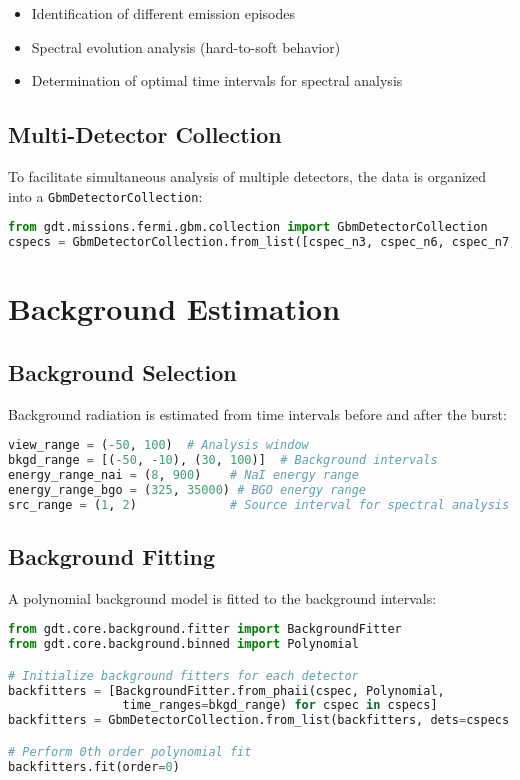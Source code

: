 \documentclass{article}
\begin{document}
\begin{itemize}
    \item Identification of different emission episodes
    \item Spectral evolution analysis (hard-to-soft behavior)
    \item Determination of optimal time intervals for spectral analysis
\end{itemize}

\subsection{Multi-Detector Collection}

To facilitate simultaneous analysis of multiple detectors, the data is organized into a \texttt{GbmDetectorCollection}:

\begin{lstlisting}[language=Python]
from gdt.missions.fermi.gbm.collection import GbmDetectorCollection
cspecs = GbmDetectorCollection.from_list([cspec_n3, cspec_n6, cspec_n7, cspec_b0])
\end{lstlisting}

\section{Background Estimation}

\subsection{Background Selection}

Background radiation is estimated from time intervals before and after the burst:

\begin{lstlisting}[language=Python]
view_range = (-50, 100)  # Analysis window
bkgd_range = [(-50, -10), (30, 100)]  # Background intervals
energy_range_nai = (8, 900)    # NaI energy range
energy_range_bgo = (325, 35000) # BGO energy range
src_range = (1, 2)             # Source interval for spectral analysis
\end{lstlisting}

\subsection{Background Fitting}

A polynomial background model is fitted to the background intervals:

\begin{lstlisting}[language=Python]
from gdt.core.background.fitter import BackgroundFitter
from gdt.core.background.binned import Polynomial

# Initialize background fitters for each detector
backfitters = [BackgroundFitter.from_phaii(cspec, Polynomial, 
                time_ranges=bkgd_range) for cspec in cspecs]
backfitters = GbmDetectorCollection.from_list(backfitters, dets=cspecs.detector())

# Perform 0th order polynomial fit
backfitters.fit(order=0)
\end{lstlisting}
\end{document}
